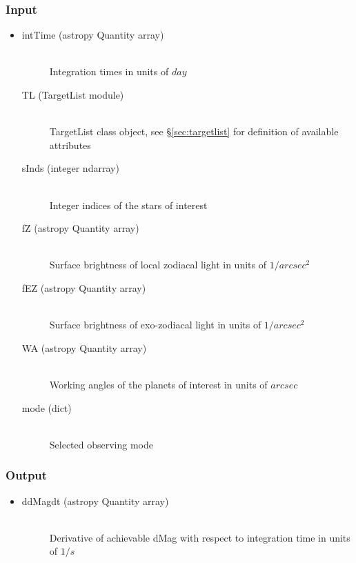 \documentclass[cleanfoot]{asme2ej}
\begin{document}
\subsubsection*{Input}
\begin{itemize}
\item 
\begin{description}
    \item[intTime (astropy Quantity array)] \hfill \\ Integration times in units of $ day $
    \item[TL (TargetList module)] \hfill \\ TargetList class object, see \S\ref{sec:targetlist} for definition of available attributes
    \item[sInds (integer ndarray)] \hfill \\ Integer indices of the stars of interest
    \item[fZ (astropy Quantity array)] \hfill \\ Surface brightness of local zodiacal light in units of $ 1/arcsec^2 $
    \item[fEZ (astropy Quantity array)] \hfill \\ Surface brightness of exo-zodiacal light in units of $ 1/arcsec^2 $
    \item[WA (astropy Quantity array)] \hfill \\ Working angles of the planets of interest in units of $ arcsec $
    \item[mode (dict)] \hfill \\ Selected observing mode
\end{description}
\end{itemize}
\subsubsection*{Output}
\begin{itemize}
\item 
\begin{description}
    \item[ddMagdt (astropy Quantity array)] \hfill \\ Derivative of achievable dMag with respect to integration time in units of $ 1/s $
\end{description}
\end{itemize}


\end{document}
